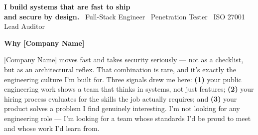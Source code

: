 \documentclass{coverletter}
\begin{document}
\noindent%
\begingroup
  \setlength{\fboxrule}{0pt}%
  \setlength{\fboxsep}{0pt}%
  \colorbox{accent!8}{%
    \parbox{\linewidth}{%
      \vspace{0.35cm}%
      \hspace{0.5cm}%
      \begin{minipage}{\dimexpr\linewidth-1cm}
        {\sffamily\bfseries\LARGE\color{accent!80!primary}
          I build systems that are fast to ship\\
          and secure by design.}
        \vspace{0.08cm}
        \vspace{0.15cm}
        {\sffamily\small\color{muted}
          \faCode\ Full-Stack Engineer\quad
          \faShieldHalved\ Penetration Tester\quad
          \faCertificate\ ISO 27001 Lead Auditor}
        \vspace{0.35cm}
      \end{minipage}%
    }%
  }%
\endgroup

\vspace{0.4cm}

\noindent%
{\raggedright\sffamily\small\color{secondary}
  \llap{\color{accent}\rule[0.12ex]{3pt}{1em}\hspace{0.35em}}\textbf{Why [Company Name]}
}

\vspace{0.05cm}

\noindent%
{\color{secondary}\sffamily\small
  [Company Name] moves fast and takes security seriously — not as a checklist,
  but as an architectural reflex. That combination is rare, and it's exactly the
  engineering culture I'm built for. Three signals drew me here:
  \textbf{(1)} your public engineering work shows a team that thinks in systems,
  not just features;
  \textbf{(2)} your hiring process evaluates for the skills the job actually requires;
  and \textbf{(3)} your product solves a problem I find genuinely interesting.
  I'm not looking for any engineering role — I'm looking for a team whose standards
  I'd be proud to meet and whose work I'd learn from.
}
\end{document}
